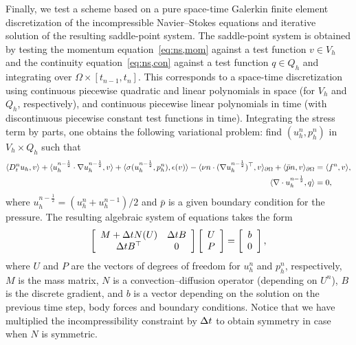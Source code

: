 Finally, we test a scheme based on a pure space-time Galerkin finite
element discretization of the incompressible Navier--Stokes equations
and iterative solution of the resulting saddle-point system. The
saddle-point system is obtained by testing the momentum
equation~\eqref{eq:ns,mom} against a test function $v \in V_h$ and the
continuity equation~\eqref{eq:ns,con} against a test function $q \in
Q_h$ and integrating over $\Omega \times [t_{n-1}, t_n]$. This
corresponds to a space-time discretization using continuous piecewise
quadratic and linear polynomials in space (for $V_h$ and $Q_h$,
respectively), and continuous piecewise linear polynomials in time
(with discontinuous piecewise constant test functions in
time). Integrating the stress term by parts, one obtains the following
variational problem: find $(u^n_h, p^n_h)$ in $V_h \times Q_h$ such
that
\begin{align}
    \renni{v}{D_t^n u_h}
    + \renni{v}{u^{n-\frac{1}{2}}_h \cdot \nabla u^{n-\frac{1}{2}}_h}
    + \renni{\epsilon(v)}{\sigma(u^{n-\frac{1}{2}}_h, p^n_h)}
    - \renni{v}{\nu n \cdot (\nabla u^{n-\frac{1}{2}}_h)^{\top}}_{\partial \Omega}
    + \renni{v}{\bar{p}n}_{\partial \Omega} &= \renni{v}{f^n}, \\
    \renni{q}{\nabla \cdot u^{n-\frac{1}{2}}_h} &= 0,
\end{align}
where $u^{n-\frac{1}{2}}_h = ({u}^n_h + {u}^{n-1}_h) / 2$ and $\bar{p}$ is a
given boundary condition for the pressure. The resulting algebraic
system of equations takes the form
\begin{equation}
\left[
\begin{array}{cc}
M + \deltat N(U) & \deltat B \\
\deltat B^{\top} & 0
\end{array}
\right]
\left[
\begin{array}{c}
U \\ P
\end{array}
\right]
=
\left[
\begin{array}{c}
b\\ 0
\end{array}
\right],
\label{timestepping}
\end{equation}
where $U$ and $P$ are the vectors of degrees of freedom for $u^n_h$
and $p^n_h$, respectively, $M$ is the mass matrix, $N$ is a
convection--diffusion operator (depending on $U^n$), $B$ is the
discrete gradient, and $b$ is a vector depending on the solution on
the previous time step, body forces and boundary conditions. Notice
that we have multiplied the incompressibility constraint by $\deltat$
to obtain symmetry in case when $N$ is symmetric.


